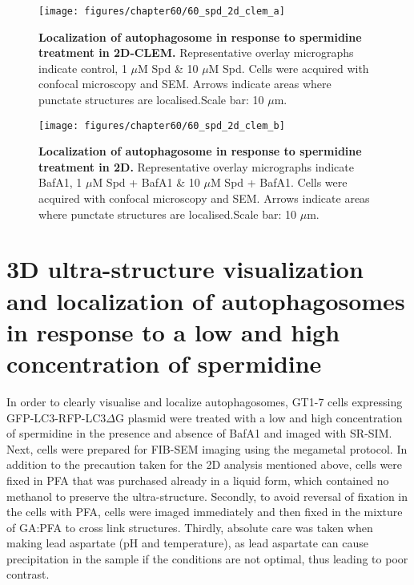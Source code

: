 \begin{landscape}
\begin{figure}[!htbp]
\center
  \texttt{[image: figures/chapter60/60\_spd\_2d\_clem\_a]}
  \caption[Localization of autophagosome in response to spermidine treatment in 2D-CLEM]{\textbf{Localization of autophagosome in response to spermidine treatment in 2D-CLEM.} Representative overlay micrographs indicate control, 1 $\mu$M Spd \& 10 $\mu$M Spd. Cells were acquired with confocal microscopy and SEM. Arrows indicate areas where punctate structures are localised.Scale bar: 10 $\mu$m.}
  \label{fig:60_spd_2d_clem_a}
\end{figure} 
\end{landscape}

\begin{landscape}
\begin{figure}[!htbp]
\centering
  \texttt{[image: figures/chapter60/60\_spd\_2d\_clem\_b]}
  \caption[Localization of autophagosome in response to spermidine treatment in 2D]{\textbf{Localization of autophagosome in response to spermidine treatment in 2D.} Representative overlay micrographs indicate BafA1, 1 $\mu$M Spd + BafA1 \& 10 $\mu$M Spd + BafA1. Cells were acquired with confocal microscopy and SEM. Arrows indicate areas where punctate structures are localised.Scale bar: 10 $\mu$m.}
  \label{fig:60_spd_2d_clem_b}
\end{figure} 
\end{landscape}

\section{3D ultra-structure visualization and localization of autophagosomes  in response to a low and high concentration of spermidine}
In order to clearly visualise and localize autophagosomes, GT1-7 cells expressing GFP-LC3-RFP-LC3$\Delta$G plasmid were treated with a low and high concentration of spermidine in the presence and absence of BafA1 and imaged with SR-SIM. Next, cells were prepared for FIB-SEM imaging using the megametal protocol. In addition to the precaution taken for the 2D analysis mentioned above, cells were fixed in PFA that was purchased already in a liquid form, which contained no methanol to preserve the ultra-structure. Secondly, to avoid reversal of fixation in the cells with PFA, cells were imaged immediately and then fixed in the mixture of GA:PFA to cross link structures. Thirdly, absolute care was taken when making lead aspartate (pH and temperature), as lead aspartate can cause precipitation in the sample if the conditions are not optimal, thus leading to poor contrast.

